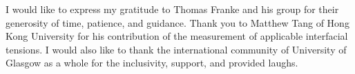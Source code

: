 \begin{acknowledgements}
I would like to express my gratitude to Thomas Franke and his group for their generosity of time, patience, and guidance. Thank you to Matthew Tang of Hong Kong University for his contribution of the measurement of applicable interfacial tensions. I would also like to thank the international community of University of Glasgow as a whole for the inclusivity, support, and provided laughs.
\end{acknowledgements}
